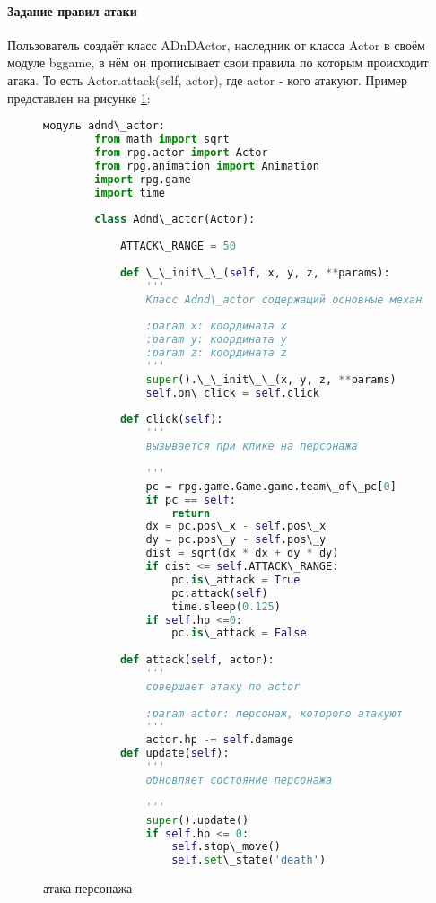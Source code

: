 \paragraph{Задание правил атаки}
Пользователь создаёт класс ADnDActor, наследник от класса Actor в своём модуле bggame, в нём он прописывает свои правила по которым происходит атака. То есть Actor.attack(self, actor), где actor - кого атакуют.
Пример представлен на рисунке \ref{attack:image}:
\begin{figure}[H]
	\begin{lstlisting}[language=Python]
		модуль adnd\_actor:
		from math import sqrt
		from rpg.actor import Actor
		from rpg.animation import Animation
		import rpg.game
		import time
		
		class Adnd\_actor(Actor):
		
			ATTACK\_RANGE = 50
		
			def \_\_init\_\_(self, x, y, z, **params):
				'''
				Класс Adnd\_actor содержащий основные механики взаимодействия с другими персонажами
		
				:param x: координата x
				:param y: координата y
				:param z: координата z
				'''
				super().\_\_init\_\_(x, y, z, **params)
				self.on\_click = self.click
			
			def click(self):
				'''
				вызывается при клике на персонажа
		
				'''
				pc = rpg.game.Game.game.team\_of\_pc[0]
				if pc == self:
					return
				dx = pc.pos\_x - self.pos\_x
				dy = pc.pos\_y - self.pos\_y
				dist = sqrt(dx * dx + dy * dy)
				if dist <= self.ATTACK\_RANGE:
					pc.is\_attack = True
					pc.attack(self)
					time.sleep(0.125)
				if self.hp <=0:
					pc.is\_attack = False
		
			def attack(self, actor):
				'''
				совершает атаку по actor
		
				:param actor: персонаж, которого атакуют
				'''
				actor.hp -= self.damage
			def update(self):
				'''
				обновляет состояние персонажа
		
				'''
				super().update()
				if self.hp <= 0:
					self.stop\_move()
					self.set\_state('death')
\end{lstlisting}  
\caption{атака персонажа}
\label{attack:image}
\end{figure}

